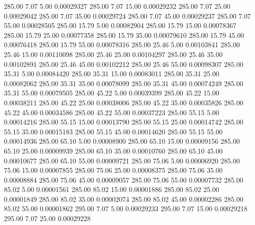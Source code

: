     285.00      7.07      5.00     0.00029327
    285.00      7.07     15.00     0.00029232
    285.00      7.07     25.00     0.00029042
    285.00      7.07     35.00     0.00029724
    285.00      7.07     45.00     0.00029237
    285.00      7.07     55.00     0.00028505
    285.00     15.79      5.00     0.00082904
    285.00     15.79     15.00     0.00078367
    285.00     15.79     25.00     0.00077358
    285.00     15.79     35.00     0.00079610
    285.00     15.79     45.00     0.00076418
    285.00     15.79     55.00     0.00078316
    285.00     25.46      5.00     0.00103841
    285.00     25.46     15.00     0.00110098
    285.00     25.46     25.00     0.00104297
    285.00     25.46     35.00     0.00102891
    285.00     25.46     45.00     0.00102212
    285.00     25.46     55.00     0.00098307
    285.00     35.31      5.00     0.00084420
    285.00     35.31     15.00     0.00083011
    285.00     35.31     25.00     0.00082062
    285.00     35.31     35.00     0.00078099
    285.00     35.31     45.00     0.00074249
    285.00     35.31     55.00     0.00079505
    285.00     45.22      5.00     0.00039399
    285.00     45.22     15.00     0.00038211
    285.00     45.22     25.00     0.00038006
    285.00     45.22     35.00     0.00035826
    285.00     45.22     45.00     0.00034586
    285.00     45.22     55.00     0.00037223
    285.00     55.15      5.00     0.00014216
    285.00     55.15     15.00     0.00013790
    285.00     55.15     25.00     0.00014742
    285.00     55.15     35.00     0.00015183
    285.00     55.15     45.00     0.00014620
    285.00     55.15     55.00     0.00014936
    285.00     65.10      5.00     0.00008900
    285.00     65.10     15.00     0.00009156
    285.00     65.10     25.00     0.00009939
    285.00     65.10     35.00     0.00010760
    285.00     65.10     45.00     0.00010677
    285.00     65.10     55.00     0.00009721
    285.00     75.06      5.00     0.00006920
    285.00     75.06     15.00     0.00007855
    285.00     75.06     25.00     0.00008375
    285.00     75.06     35.00     0.00008884
    285.00     75.06     45.00     0.00009057
    285.00     75.06     55.00     0.00007732
    285.00     85.02      5.00     0.00001561
    285.00     85.02     15.00     0.00001886
    285.00     85.02     25.00     0.00001849
    285.00     85.02     35.00     0.00002074
    285.00     85.02     45.00     0.00002286
    285.00     85.02     55.00     0.00001862
    295.00      7.07      5.00     0.00029233
    295.00      7.07     15.00     0.00029218
    295.00      7.07     25.00     0.00029228
